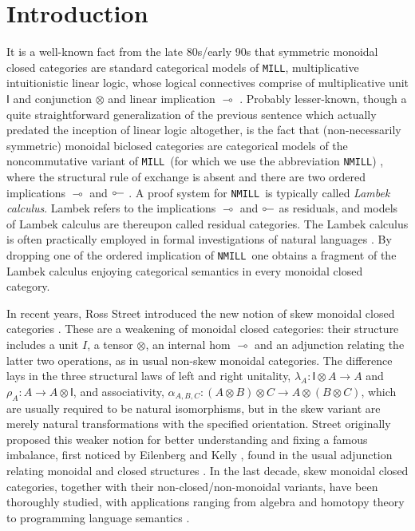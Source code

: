 \documentclass[submission,copyright,creativecommons]{eptcs}
\theoremstyle{definition}
\newcommand{\ot}{\otimes}
\newcommand{\lolli}{\multimap}
\newcommand{\illol}{\rotatebox[origin=c]{180}{$\multimap$}}
\newcommand{\I}{\mathsf{I}}
\newcommand{\MILL}{\texttt{MILL}}
\newcommand{\NMILL}{\texttt{NMILL}}
\begin{document}
\section{Introduction}
It is a well-known fact from the late 80s/early 90s that symmetric monoidal closed categories are standard categorical models of \MILL, multiplicative intuitionistic linear logic, whose logical connectives comprise of multiplicative unit $\I$ and conjunction $\ot$ and linear implication $\lolli$ \cite{mellies:categorical:09}. Probably lesser-known, though a quite straightforward generalization of the previous sentence which actually predated the inception of linear logic altogether, is the fact that (non-necessarily symmetric) monoidal biclosed categories are categorical models of the noncommutative variant of \MILL\ (for which we use the abbreviation \NMILL) \cite{abrusci:noncommutative:1990}, where the structural rule of exchange is absent and there are two ordered implications $\lolli$ and $\illol$ \cite{lambek:deductive:68}. A proof system for \NMILL\ is typically called \emph{Lambek calculus}. Lambek refers to the implications $\lolli$ and $\illol$ as residuals, and models of Lambek calculus are thereupon called residual categories. The Lambek calculus is often practically employed in formal investigations of natural languages \cite{lambek:mathematics:58}.
By dropping one of the ordered implication of \NMILL\ one obtains a fragment of the Lambek calculus enjoying categorical semantics in every monoidal closed category.

In recent years, Ross Street introduced the new notion of skew monoidal closed categories \cite{street:skew-closed:2013}. These are a weakening of monoidal closed categories: their structure includes a unit $I$, a tensor $\ot$, an internal hom $\lolli$ and an adjunction relating the latter two operations, as in usual non-skew monoidal categories. The difference lays in the three structural laws of left and right unitality, $\lambda_A : \I \ot A \to A$ and $\rho_A : A \to A \ot \I$, and associativity, $\alpha_{A,B,C} : (A \ot B) \ot C \to A \ot (B \ot C)$, which are usually required to be natural isomorphisms, but in the skew variant are merely natural transformations with the specified orientation. Street originally proposed this weaker notion for better understanding and fixing a famous imbalance, first noticed by Eilenberg and Kelly \cite{eilenberg:closed:1966}, found in the usual adjunction relating monoidal and closed structures \cite{street:skew-closed:2013,uustalu:eilenberg-kelly:2020}. In the last decade, skew monoidal closed categories, together with their non-closed/non-monoidal variants, have been thoroughly studied, with applications ranging from algebra and homotopy theory to programming language semantics \cite{szlachanyi:skew-monoidal:2012,lack:skew:2012,lack:triangulations:2014,altenkirch:monads:2014,buckley:catalan:2015,bourke:skew:2017,bourke:skew:2018,tomita:realizability:21}.
\end{document}
